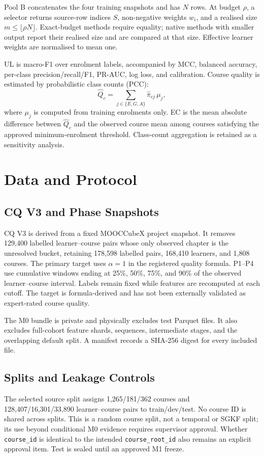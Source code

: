 \documentclass[runningheads]{llncs}
\begin{document}
Pool B concatenates the four training snapshots and has $N$ rows.  At budget
$\rho$, a selector returns source-row indices $S$, non-negative weights $w_i$,
and a realised size $m\le\lfloor\rho N\rfloor$.  Exact-budget methods require
equality; native methods with smaller output report their realised size and are
compared at that size.  Effective learner weights are normalised to mean one.

UL is macro-F1 over enrolment labels, accompanied by MCC, balanced accuracy,
per-class precision/recall/F1, PR-AUC, log loss, and calibration.  Course
quality is estimated by probabilistic class counts (PCC):
\[
\widehat Q_c=\sum_{j\in\{E,G,A\}}\widehat\pi_{cj}\,\mu_j,
\]
where $\mu_j$ is computed from training enrolments only.  EC is the mean
absolute difference between $\widehat Q_c$ and the observed course mean among
courses satisfying the approved minimum-enrolment threshold.  Class-count
aggregation is retained as a sensitivity analysis.

\section{Data and Protocol}
\subsection{CQ V3 and Phase Snapshots}
CQ V3 is derived from a fixed MOOCCubeX project snapshot.  It removes 129,400
labelled learner--course pairs whose only observed chapter is the unresolved
bucket, retaining 178,598 labelled pairs, 168,410 learners, and 1,808 courses.
The primary target uses $\alpha=1$ in the registered quality formula.  P1--P4
use cumulative windows ending at 25\%, 50\%, 75\%, and 90\% of the observed
learner--course interval.  Labels remain fixed while features are recomputed at
each cutoff.  The target is formula-derived and has not been externally
validated as expert-rated course quality.

The M0 bundle is private and physically excludes test Parquet files.  It also
excludes full-cohort feature shards, sequences, intermediate stages, and the
overlapping default split.  A manifest records a SHA-256 digest for every
included file.
\subsection{Splits and Leakage Controls}
The selected source split assigns 1,265/181/362 courses and
128,407/16,301/33,890 learner--course pairs to train/dev/test.  No course ID is
shared across splits.  This is a random course split, not a temporal or SGKF
split; its use beyond conditional M0 evidence requires supervisor approval.
Whether \texttt{course\_id} is identical to the intended
\texttt{course\_root\_id} also remains an explicit approval item.  Test is
sealed until an approved M1 freeze.
\end{document}
